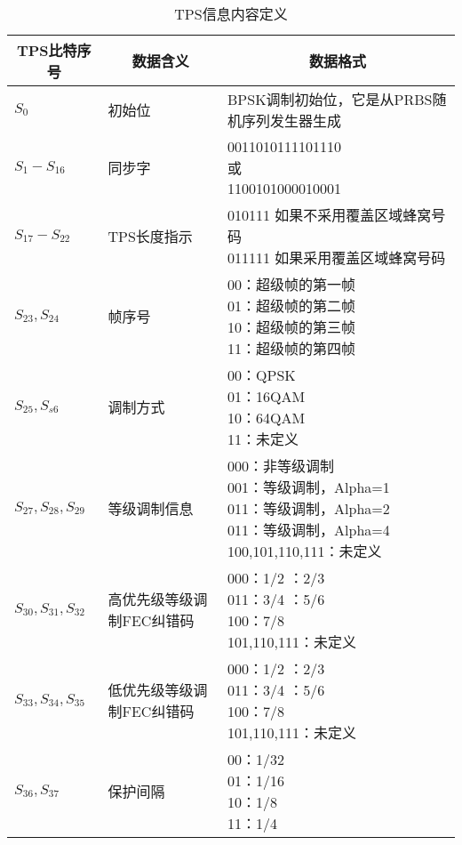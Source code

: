\begin{table}[!hbp]
	\centering
	\caption{TPS信息内容定义}
	\begin{tabular}{|m{2cm}<{\centering}|m{3cm}<{\centering}|m{8cm}<{\centering}|}
	\hline\hline
	\multicolumn{1}{|c|}{TPS比特序号} & \multicolumn{1}{c|}{数据含义} & \multicolumn{1}{c|}{数据格式} \\
	\hline
	$S_0$ & 初始位 & BPSK调制初始位，它是从PRBS随机序列发生器生成 \\
	\hline
	$S_1-S_{16}$ & 同步字 & \tabincell{c}{0011010111101110 \\ 或 \\ 1100101000010001} \\
	\hline
	$S_{17}-S_{22}$ & TPS长度指示 & \tabincell{l}{010111 如果不采用覆盖区域蜂窝号码 \\ 011111 如果采用覆盖区域蜂窝号码}\\
	\hline
	$S_{23},S_{24}$ & 帧序号 & \tabincell{l}{00：超级帧的第一帧 \\ 01：超级帧的第二帧 \\ 10：超级帧的第三帧 \\ 11：超级帧的第四帧} \\
	\hline
	$S_{25},S_{s6}$ & 调制方式 & \tabincell{l}{00：QPSK \\ 01：16QAM \\ 10：64QAM \\ 11：未定义} \\
	\hline
	$S_{27},S_{28},S_{29}$ & 等级调制信息 & \tabincell{l}{000：非等级调制 \\ 001：等级调制，Alpha=1 \\ 011：等级调制，Alpha=2 \\ 011：等级调制，Alpha=4 \\ 100,101,110,111：未定义} \\
	\hline
	$S_{30},S_{31},S_{32}$ & 高优先级等级调制FEC纠错码 & \tabincell{c}{000：1/2 \qquad 001：2/3 \\ 011：3/4 \qquad 011：5/6 \\ 100：7/8 \\ 101,110,111：未定义} \\
	\hline
	$S_{33},S_{34},S_{35}$ & 低优先级等级调制FEC纠错码 & \tabincell{c}{000：1/2 \qquad 001：2/3 \\ 011：3/4 \qquad 011：5/6 \\ 100：7/8 \\ 101,110,111：未定义} \\
	\hline
	$S_{36},S_{37}$ & 保护间隔 & \tabincell{l}{00：1/32 \\ 01：1/16 \\ 10：1/8 \\ 11：1/4} \\

\end{tabular}
\end{table}
